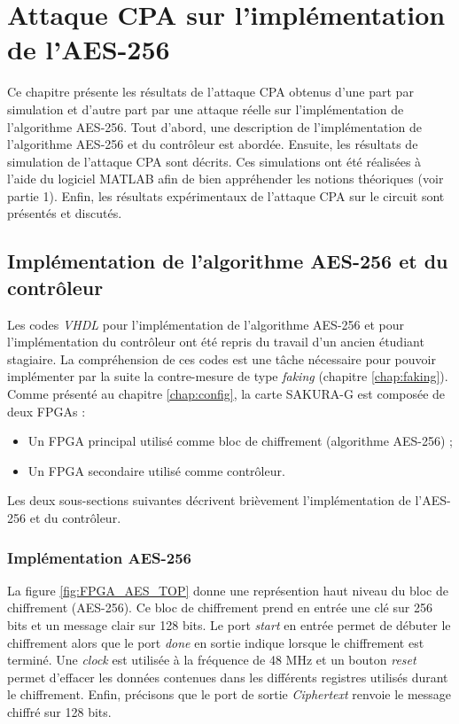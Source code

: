 \documentclass[oneside]{book}
\begin{document}
\newpage


\chapter{Attaque CPA sur l'implémentation de l'AES-256}
\label{chap:CPA_Result}

Ce chapitre présente les résultats de l'attaque CPA obtenus d'une part par simulation et d'autre part par une attaque réelle sur l'implémentation de l'algorithme AES-256. Tout d'abord, une description de l'implémentation de l'algorithme AES-256 et du contrôleur est abordée. Ensuite, les résultats de simulation de l'attaque CPA sont décrits. Ces simulations ont été réalisées à l'aide du logiciel MATLAB afin de bien appréhender les notions théoriques (voir partie 1). Enfin, les résultats expérimentaux de l'attaque CPA sur le circuit sont présentés et discutés. 

\section{Implémentation de l'algorithme AES-256 et du contrôleur}
\label{sec:AES_256}

Les codes \textit{VHDL} pour l'implémentation de l'algorithme AES-256 et pour l'implémentation du contrôleur ont été repris du travail d'un ancien étudiant stagiaire. La compréhension de ces codes est une tâche nécessaire pour pouvoir implémenter par la suite la contre-mesure de type \textit{faking} (chapitre \ref{chap:faking}). Comme présenté au chapitre \ref{chap:config}, la carte SAKURA-G est composée de deux FPGAs : 
\begin{itemize}
\item Un FPGA principal utilisé comme bloc de chiffrement (algorithme AES-256) ;
\item Un FPGA secondaire utilisé comme contrôleur.
\end{itemize}

\hspace{-0.5cm}Les deux sous-sections suivantes décrivent brièvement l'implémentation de l'AES-256 et du contrôleur.

\subsection{Implémentation AES-256}
\label{sec:Imp_AES_256}

La figure \ref{fig:FPGA_AES_TOP} donne une représention haut niveau du bloc de chiffrement (AES-256). Ce bloc de chiffrement prend en entrée une clé sur 256 bits et un message clair sur 128 bits. Le port \textit{start} en entrée permet de débuter le chiffrement alors que le port \textit{done} en sortie indique lorsque le chiffrement est terminé. Une \textit{clock} est utilisée à la fréquence de 48 MHz et un bouton \textit{reset} permet d'effacer les données contenues dans les différents registres utilisés durant le chiffrement. Enfin, précisons que le port de sortie \textit{Ciphertext} renvoie le message chiffré sur 128 bits.
\end{document}
